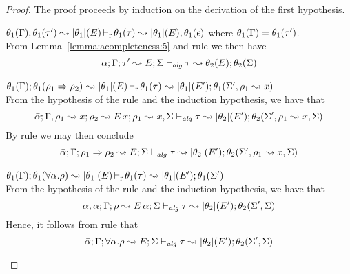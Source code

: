 \begin{proof}
The proof proceeds by induction on the derivation of the first hypothesis.
\begin{description}
\setlength{\itemsep}{1em}
\item[\fbox{\texttt{(M-Simp)}}]\quad$\theta_1(\Gamma); \theta_1(\tau') \leadsto |\theta_1|(E) \mathop{\vdash_{\mathrm{r}}} \theta_1(\tau) \leadsto |\theta_1|(E); \theta_1(\epsilon)$ \hfill where $\theta_1(\Gamma) = \theta_1(\tau')$. \\

From Lemma~\ref{lemma:acompleteness:5} and rule  we then have
\begin{equation*}
  \bar{\alpha}; \Gamma; \tau' \leadsto E; \Sigma \vdash_{\mathit{alg}} \tau \leadsto \theta_2(E); \theta_2(\Sigma)
\end{equation*}

\item[\fbox{\texttt{(M-IApp)}}]\quad$\theta_1(\Gamma); \theta_1(\rho_1 \Rightarrow \rho_2)~{\leadsto |\theta_1|(E)}\mathop{\vdash_{\mathrm{r}}} \theta_1(\tau)~{\leadsto |\theta_1|(E')}; \theta_1(\Sigma',\rho_1 \leadsto x)$ \ \\
  From the hypothesis of the rule and the induction hypothesis, we have that
\begin{equation*}
 \bar{\alpha};\Gamma,\rho_1 \leadsto x;\rho_2 \leadsto E\,x; \rho_1 \leadsto x, \Sigma \vdash_{\mathit{alg}} \tau \leadsto |\theta_2|(E'); \theta_2(\Sigma',\rho_1 \leadsto x, \Sigma) 
\end{equation*}
  By rule  we may then conclude
\begin{equation*}
 \bar{\alpha};\Gamma;\rho_1 \Rightarrow \rho_2 \leadsto E; \Sigma \vdash_{\mathit{alg}} \tau \leadsto |\theta_2|(E'); \theta_2(\Sigma',\rho_1 \leadsto x, \Sigma) 
\end{equation*} 

\item[\fbox{\texttt{(M-TApp)}}]\quad$\theta_1(\Gamma); \theta_1(\forall\alpha.\rho) \leadsto |\theta_1|(E) \mathop{\vdash_{\mathrm{r}}} \theta_1(\tau) \leadsto |\theta_1|(E'); \theta_1(\Sigma')$ \ \\
  From the hypothesis of the rule and the induction hypothesis, we have that
\begin{equation*}
 \bar{\alpha},\alpha;\Gamma;\rho \leadsto E\,\alpha; \Sigma \vdash_{\mathit{alg}} \tau \leadsto |\theta_2|(E'); \theta_2(\Sigma',\Sigma) 
\end{equation*}
  Hence, it follows from rule  that
\begin{equation*}
 \bar{\alpha};\Gamma;\forall \alpha.\rho \leadsto E; \Sigma \vdash_{\mathit{alg}} \tau \leadsto |\theta_2|(E'); \theta_2(\Sigma',\Sigma) 
\end{equation*}


\end{description}
\end{proof}
